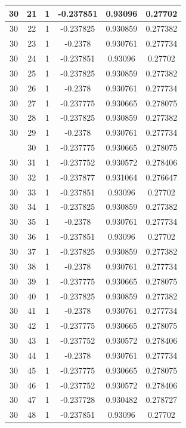\documentclass[12pt,a4paper]{article}
\numberwithin{equation}{section}
\numberwithin{figure}{section}
\numberwithin{table}{section}
\begin{document}
\begin{longtable}{|c|c|c|c|c|c|}
30 & 21 & 1 & -0.237851 & 0.93096 & 0.27702 \\ \hline
30 & 22 & 1 & -0.237825 & 0.930859 & 0.277382 \\ \hline
30 & 23 & 1 & -0.2378 & 0.930761 & 0.277734 \\ \hline
30 & 24 & 1 & -0.237851 & 0.93096 & 0.27702 \\ \hline
30 & 25 & 1 & -0.237825 & 0.930859 & 0.277382 \\ \hline
30 & 26 & 1 & -0.2378 & 0.930761 & 0.277734 \\ \hline
30 & 27 & 1 & -0.237775 & 0.930665 & 0.278075 \\ \hline
30 & 28 & 1 & -0.237825 & 0.930859 & 0.277382 \\ \hline
30 & 29 & 1 & -0.2378 & 0.930761 & 0.277734 \\ \hline
\pagebreak
30 & 30 & 1 & -0.237775 & 0.930665 & 0.278075 \\ \hline
30 & 31 & 1 & -0.237752 & 0.930572 & 0.278406 \\ \hline
30 & 32 & 1 & -0.237877 & 0.931064 & 0.276647 \\ \hline
30 & 33 & 1 & -0.237851 & 0.93096 & 0.27702 \\ \hline
30 & 34 & 1 & -0.237825 & 0.930859 & 0.277382 \\ \hline
30 & 35 & 1 & -0.2378 & 0.930761 & 0.277734 \\ \hline
30 & 36 & 1 & -0.237851 & 0.93096 & 0.27702 \\ \hline
30 & 37 & 1 & -0.237825 & 0.930859 & 0.277382 \\ \hline
30 & 38 & 1 & -0.2378 & 0.930761 & 0.277734 \\ \hline
30 & 39 & 1 & -0.237775 & 0.930665 & 0.278075 \\ \hline
30 & 40 & 1 & -0.237825 & 0.930859 & 0.277382 \\ \hline
30 & 41 & 1 & -0.2378 & 0.930761 & 0.277734 \\ \hline
30 & 42 & 1 & -0.237775 & 0.930665 & 0.278075 \\ \hline
30 & 43 & 1 & -0.237752 & 0.930572 & 0.278406 \\ \hline
30 & 44 & 1 & -0.2378 & 0.930761 & 0.277734 \\ \hline
30 & 45 & 1 & -0.237775 & 0.930665 & 0.278075 \\ \hline
30 & 46 & 1 & -0.237752 & 0.930572 & 0.278406 \\ \hline
30 & 47 & 1 & -0.237728 & 0.930482 & 0.278727 \\ \hline
30 & 48 & 1 & -0.237851 & 0.93096 & 0.27702 \\ \hline

\end{longtable}
\end{document}
